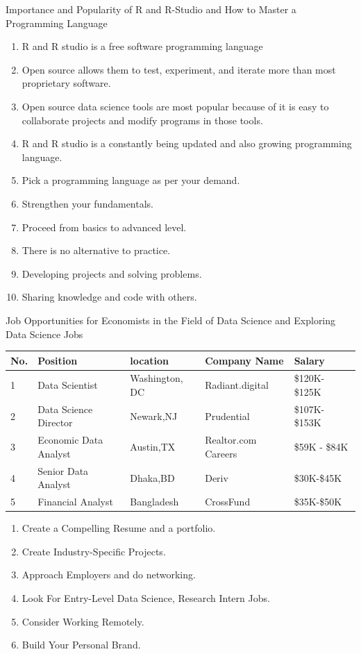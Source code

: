 \documentclass[aspectratio=169]{beamer}
\begin{document}
\begin{frame}{Importance and Popularity of R and R-Studio and How to Master a Programming Language}
	\begin{enumerate}
		
		\item R and R studio is a free software programming language
		
		\item  Open source allows them to test, experiment, and iterate more than most proprietary software. 
		
		\item  Open source data science tools are most popular because of it is easy to collaborate projects and modify programs in those tools.
		
		\item  R and R studio is a constantly being updated and also growing programming language.
		\item Pick a programming language as per your demand.
		\item Strengthen your fundamentals.
		\item Proceed from basics to advanced level.
		\item 	There is no alternative to practice.
		\item 	Developing  projects and solving problems.
		\item Sharing knowledge and code with others.
		
		
	\end{enumerate}
	
	
\end{frame}
\begin{frame}{Job Opportunities for Economists in the Field of Data Science and Exploring Data Science Jobs}
	\begin{tabular}{|l|l|l|l|l|}
		\hline
		No. &Position&location&Company Name& Salary\\
		\hline
		1 & Data Scientist&Washington, DC
		& Radiant.digital& \$120K- \$125K\\
		\hline
		2&Data Science Director&Newark,NJ&Prudential&\$107K- \$153K \\
		\hline
		3 & Economic Data Analyst&Austin,TX& Realtor.com Careers&\$59K - \$84K\\
		\hline
		4&Senior Data Analyst&Dhaka,BD&Deriv&\$30K-\$45K\\
		\hline
		5&Financial Analyst&Bangladesh&CrossFund&\$35K-\$50K\\
		\hline
		
	\end{tabular}
	\begin{enumerate}
		\item     Create a Compelling Resume and a portfolio.
		\item Create Industry-Specific Projects.
		\item Approach Employers and do networking.
		\item Look For Entry-Level Data Science, Research Intern Jobs.
		\item Consider Working Remotely.
		\item Build Your Personal Brand.
	\end{enumerate}
\end{frame}
\end{document}
